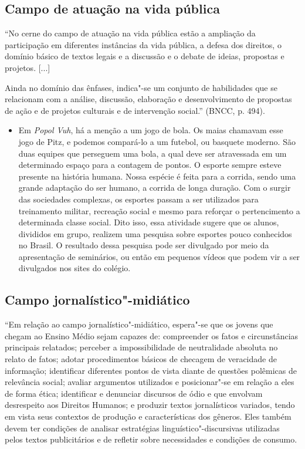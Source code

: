 \documentclass[12pt]{extarticle}
\begin{document}
\subsection{Campo de atuação na vida pública}

``No cerne do campo de atuação na vida pública estão a ampliação da
participação em diferentes instâncias da vida pública, a defesa dos
direitos, o domínio básico de textos legais e a discussão e o debate de
ideias, propostas e projetos. {[}...{]}

Ainda no domínio das ênfases, indica"-se um conjunto de habilidades que
se relacionam com a análise, discussão, elaboração e desenvolvimento de
propostas de ação e de projetos culturais e de intervenção social.''
(BNCC, p. 494).

\begin{itemize}
\item
  Em \emph{Popol Vuh}, há a menção a um jogo de bola. Os maias chamavam
  esse jogo de Pitz, e podemos compará-lo a um futebol, ou basquete
  moderno. São duas equipes que perseguem uma bola, a qual deve ser
  atravessada em um determinado espaço para a contagem de pontos. O
  esporte sempre esteve presente na história humana. Nossa espécie é
  feita para a corrida, sendo uma grande adaptação do ser humano, a
  corrida de longa duração. Com o surgir das sociedades complexas, os
  esportes passam a ser utilizados para treinamento militar, recreação
  social e mesmo para reforçar o pertencimento a determinada classe
  social. Dito isso, essa atividade sugere que os alunos, divididos em
  grupo, realizem uma pesquisa sobre esportes pouco conhecidos no
  Brasil. O resultado dessa pesquisa pode ser divulgado por meio da
  apresentação de seminários, ou então em pequenos vídeos que podem vir
  a ser divulgados nos sites do colégio.
\end{itemize}

\subsection{Campo jornalístico"-midiático}

``Em relação ao campo jornalístico"-midiático, espera"-se que os jovens
que chegam ao Ensino Médio sejam capazes de: compreender os fatos e
circunstâncias principais relatados; perceber a impossibilidade de
neutralidade absoluta no relato de fatos; adotar procedimentos básicos
de checagem de veracidade de informação; identificar diferentes pontos
de vista diante de questões polêmicas de relevância social; avaliar
argumentos utilizados e posicionar"-se em relação a eles de forma ética;
identificar e denunciar discursos de ódio e que envolvam desrespeito aos
Direitos Humanos; e produzir textos jornalísticos variados, tendo em
vista seus contextos de produção e características dos gêneros. Eles
também devem ter condições de analisar estratégias
linguístico"-discursivas utilizadas pelos textos publicitários e de
refletir sobre necessidades e condições de consumo.
\end{document}
